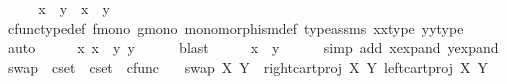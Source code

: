 \begin{isabellebody}
\ \ \isamarkupfalse%
\ \isamarkupfalse%
\ {\isachardoublequoteopen}x{}\ {\isacharequal}{\kern0pt}\ y{}\ {\isasymand}\ x{}\ {\isacharequal}{\kern0pt}\ y{}{\isachardoublequoteclose}\isanewline
\ \ \ \ \isamarkupfalse%
\ cfunc{\isacharunderscore}{\kern0pt}type{\isacharunderscore}{\kern0pt}def\ f{\isacharunderscore}{\kern0pt}mono\ g{\isacharunderscore}{\kern0pt}mono\ monomorphism{\isacharunderscore}{\kern0pt}def\ type{\isacharunderscore}{\kern0pt}assms\ x{}{\isacharunderscore}{\kern0pt}x{}{\isacharunderscore}{\kern0pt}type\ y{}{\isacharunderscore}{\kern0pt}y{}{\isacharunderscore}{\kern0pt}type\ \isamarkupfalse%
\ auto\isanewline
\ \ \isamarkupfalse%
\ \isamarkupfalse%
\ {\isachardoublequoteopen}{\isasymlangle}x{}{\isacharcomma}{\kern0pt}\ x{}{\isasymrangle}\ {\isacharequal}{\kern0pt}\ {\isasymlangle}y{}{\isacharcomma}{\kern0pt}\ y{}{\isasymrangle}{\isachardoublequoteclose}\isanewline
\ \ \ \ \isamarkupfalse%
\ blast\isanewline
\ \ \isamarkupfalse%
\ \isamarkupfalse%
\ {\isachardoublequoteopen}x\ {\isacharequal}{\kern0pt}\ y{\isachardoublequoteclose}\isanewline
\ \ \ \ \isamarkupfalse%
\ {\isacharparenleft}{\kern0pt}simp\ add{\isacharcolon}{\kern0pt}\ x{\isacharunderscore}{\kern0pt}expand\ y{\isacharunderscore}{\kern0pt}expand{\isacharparenright}{\kern0pt}\isanewline
{}\isamarkupfalse%
%
\endisatagproof
{\isafoldproof}%
%
\isadelimproof
%
\endisadelimproof
%
\isadelimdocument
%
\endisadelimdocument
%
\isatagdocument
%
\isamarkuptrue%
%
\isamarkuptrue%
%
\endisatagdocument
{\isafolddocument}%
%
\isadelimdocument
%
\endisadelimdocument
{}\isamarkupfalse%
\ swap\ {\isacharcolon}{\kern0pt}{\isacharcolon}{\kern0pt}\ {\isachardoublequoteopen}cset\ {\isasymRightarrow}\ cset\ {\isasymRightarrow}\ cfunc{\isachardoublequoteclose}\ \isanewline
\ \ {\isachardoublequoteopen}swap\ X\ Y\ {\isacharequal}{\kern0pt}\ {\isasymlangle}right{\isacharunderscore}{\kern0pt}cart{\isacharunderscore}{\kern0pt}proj\ X\ Y{\isacharcomma}{\kern0pt}\ left{\isacharunderscore}{\kern0pt}cart{\isacharunderscore}{\kern0pt}proj\ X\ Y{\isasymrangle}{\isachardoublequoteclose}\isanewline
\isanewline
{}\isamarkupfalse%

\end{isabellebody}
